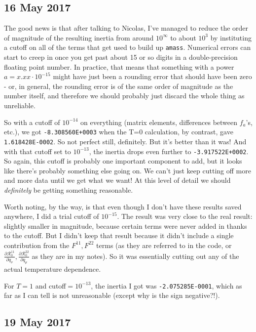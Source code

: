 \documentclass[]{report}
\begin{document}
\subsection*{16 May 2017}

The good news is that after talking to Nicolas, I've managed to reduce the order of magnitude of the resulting inertia from around $10^\infty$ to about $10^3$ by instituting a cutoff on all of the terms that get used to build up \verb|amass|. Numerical errors can start to creep in once you get past about 15 or so digits in a double-precision floating point number. In practice, that means that something with a power $a=x.xx\cdot10^{-15}$ might have just been a rounding error that should have been zero - or, in general, the rounding error is of the same order of magnitude as the number itself, and therefore we should probably just discard the whole thing as unreliable.

So with a cutoff of $10^{-14}$ on everything (matrix elements, differences between $f_a$'s, etc.), we got \verb|-8.308560E+0003| when the T=0 calculation, by contrast, gave \verb|1.618428E-0002|. So not perfect still, definitely. But it's better than it was! And with that cutoff set to $10^{-13}$, the inertia drops even further to \verb|-3.917522E+0002|. So again, this cutoff is probably one important component to add, but it looks like there's probably something else going on. We can't just keep cutting off more and more data until we get what we want! At this level of detail we should \textit{definitely} be getting something reasonable.

Worth noting, by the way, is that even though I don't have these results saved anywhere, I did a trial cutoff of $10^{-15}$. The result was very close to the real result: slightly smaller in magnitude, because certain terms were never added in thanks to the cutoff. But I didn't keep that result because it didn't include a single contribution from the $F^{11}, F^{22}$ terms (as they are referred to in the code, or $\frac{\partial\mathcal{R}^{11}_{0}}{\partial q_\nu}, \frac{\partial\mathcal{R}^{22}_{0}}{\partial q_\mu}$ as they are in my notes). So it was essentially cutting out any of the actual temperature dependence.

For $T=1$ and cutoff$=10^{-13}$, the inertia I got was \verb|-2.075285E-0001|, which as far as I can tell is not unreasonable (except why is the sign negative?!).

\subsection*{19 May 2017}
\end{document}
